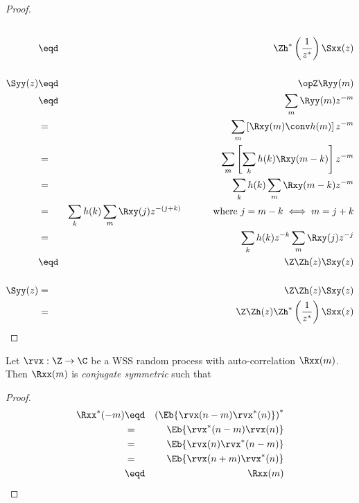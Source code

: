 \begin{proof}
\begin{eqnarray*}
   \\&\eqd& \Zh^\ast\left(\frac{1}{z^\ast}\right) \Sxx(z)
\\
\\
   \Syy(z)
     &\eqd& \opZ \Ryy(m)
   \\&\eqd& \sum_m \Ryy(m) z^{-m}
   \\&=&    \sum_m \left[ \Rxy(m) \conv h(m) \right] z^{-m}
   \\&=&    \sum_m \left[ \sum_k h(k) \Rxy(m-k)  \right] z^{-m}
   \\&=&    \sum_k h(k) \sum_m \Rxy(m-k) z^{-m}
   \\&=&    \sum_k h(k) \sum_m \Rxy(j) z^{-(j+k)}
            \hspace{3em}\mbox{ where $j=m-k\iff m=j+k$}
   \\&=&    \sum_k h(k)z^{-k}   \sum_m \Rxy(j) z^{-j}
   \\&\eqd& \Z\Zh(z) \Sxy(z)
\\
\\
   \Syy(z)
     &=& \Z\Zh(z) \Sxy(z)
   \\&=& \Z\Zh(z) \Zh^\ast\left(\frac{1}{z^\ast}\right) \Sxx(z)
\end{eqnarray*}
\end{proof}


\begin{theorem}
Let $\rvx:\Z\to\C$ be a WSS random process with
auto-correlation $\Rxx(m)$.
Then $\Rxx(m)$ is {\em conjugate symmetric} such that
\end{theorem}
\begin{proof}
\begin{eqnarray*}
   \Rxx^\ast(-m)
     &\eqd& \left( \Eb{\rvx(n-m)\rvx^\ast(n)}\right)^\ast
   \\&=&           \Eb{\rvx^\ast(n-m)\rvx(n)}
   \\&=&           \Eb{\rvx(n)\rvx^\ast(n-m)}
   \\&=&           \Eb{\rvx(n+m)\rvx^\ast(n)}
   \\&\eqd&        \Rxx(m)
\end{eqnarray*}
\end{proof}





